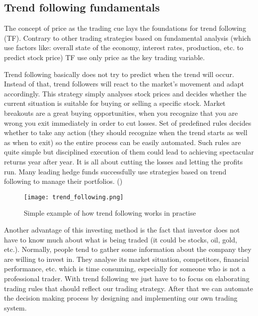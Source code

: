 \subsection{Trend following fundamentals}
\label{sec:trend_following_fundamentals}

The concept of price as the trading cue lays the foundations for trend following (TF). 
Contrary to other trading strategies based on fundamental analysis (which use factors like: overall state of the economy, interest rates, production, etc. to predict stock price)
TF use only price as the key trading variable. 

Trend following basically does not try to predict when the trend will occur. 
Instead of that, trend followers will react to the market's movement and adapt accordingly.
This strategy simply analyses stock prices and decides whether the current situation is suitable for buying or selling a specific stock.
Market breakouts are a great buying opportunities, when you recognize that you are wrong you exit immediately in order to cut losses.
Set of predefined rules decides  whether to take any action (they should recognize when the trend starts as well as when to exit) so the entire process can be easily automated.
Such rules are quite simple but disciplined execution of them could lead to achieving spectacular returns year after year.
It is all about cutting the losses and letting the profits run.
Many leading hedge funds successfully use strategies based on trend following to manage their portfolios. (\cite{Trend01})  

\begin{figure}[H]
  \begin{center}
    \texttt{[image: trend\_following.png]}
  \end{center}
  \caption{Simple example of how trend following works in practise}
\end{figure}

Another advantage of this investing method is the fact that investor does not have to know much about what is being traded (it could be stocks, oil, gold, etc.).
Normally, people tend to gather some information about the company they are willing to invest in. 
They analyse its market situation, competitors, financial performance, etc. which is time consuming, especially for someone who is not a professional trader.
With trend following we just have to to focus on elaborating trading rules that should reflect our trading strategy.
After that we can automate the decision making process by designing and implementing our own trading system.   


